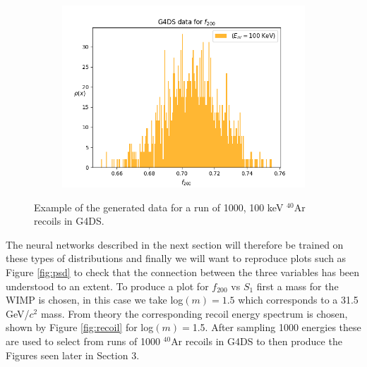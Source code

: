 \documentclass[11pt]{article} %
\begin{document}
\begin{figure}[H]\ContinuedFloat
\centering
\begin{minipage}{.5\textwidth}
  \centering
  \begin{subfigure}{.9\textwidth}
      \includegraphics[width=\textwidth]{./images/f200like_100.png}
  \end{subfigure}
\end{minipage}
\caption{Example of the generated data for a run of 1000, 100 keV $^{40}\mathrm{\text{Ar}}$ recoils in G4DS.}
\label{fig:example_vars}
\end{figure}
\par The neural networks described in the next section will therefore be trained on these types of distributions and finally we will want to reproduce
plots such as Figure \ref{fig:psd} to check that the connection between the three variables has been understood to an extent.
To produce a plot for $f_{200}$ vs $S_1$ first a mass for the WIMP is chosen, in this case we take log$(m)=1.5$ which corresponds to a 31.5 GeV/$c^2$ mass.
From theory the corresponding recoil energy spectrum is chosen, shown by Figure \ref{fig:recoil} for log$(m)=$1.5.
After sampling 1000 energies these are used to select from runs of 1000 $^{40}\mathrm{\text{Ar}}$ recoils in G4DS to then produce the Figures seen later in Section 3.
\end{document}

